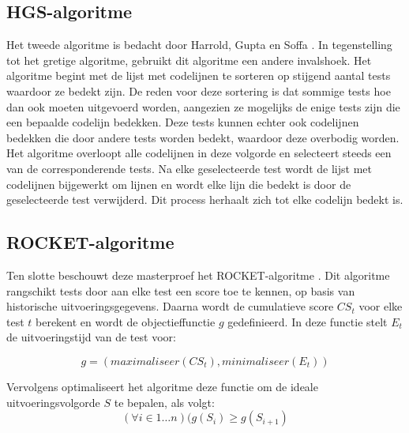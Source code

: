 \subsection{HGS-algoritme}
\noindent Het tweede algoritme is bedacht door Harrold, Gupta en Soffa \cite{hgs}. In tegenstelling tot het gretige algoritme, gebruikt dit algoritme een andere invalshoek. Het algoritme begint met de lijst met codelijnen te sorteren op stijgend aantal tests waardoor ze bedekt zijn. De reden voor deze sortering is dat sommige tests hoe dan ook moeten uitgevoerd worden, aangezien ze mogelijks de enige tests zijn die een bepaalde codelijn bedekken. Deze tests kunnen echter ook codelijnen bedekken die door andere tests worden bedekt, waardoor deze overbodig worden. Het algoritme overloopt alle codelijnen in deze volgorde en selecteert steeds een van de corresponderende tests. Na elke geselecteerde test wordt de lijst met codelijnen bijgewerkt om lijnen en wordt elke lijn die bedekt is door de geselecteerde test verwijderd. Dit process herhaalt zich tot elke codelijn bedekt is.

\subsection{ROCKET-algoritme}
\noindent Ten slotte beschouwt deze masterproef het ROCKET-algoritme \cite{6676952}. Dit algoritme rangschikt tests door aan elke test een score toe te kennen, op basis van historische uitvoeringsgegevens. Daarna wordt de cumulatieve score $CS_t$ voor elke test $t$ berekent en wordt de objectieffunctie $g$ gedefinieerd. In deze functie stelt $E_t$ de uitvoeringstijd van de test voor:

$$g = (maximaliseer(CS_t), minimaliseer(E_t))$$

\noindent Vervolgens optimaliseert het algoritme deze functie om de ideale uitvoeringsvolgorde $S$ te bepalen, als volgt:
$$(\forall i \in 1 \dots n)(g(S_i) \ge g(S_{i+1})$$